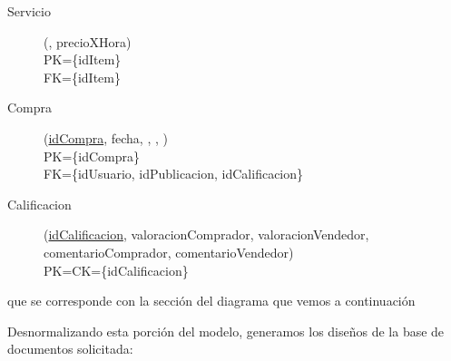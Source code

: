 \begin{description}
 \item[Servicio](\underline{}, precioXHora)\\
PK=\{idItem\}\\
FK=\{idItem\}

 \item[Compra](\underline{idCompra}, fecha, , , )\\
PK=\{idCompra\}\\
FK=\{idUsuario, idPublicacion, idCalificacion\}

 \item[Calificacion](\underline{idCalificacion}, valoracionComprador, valoracionVendedor, comentarioComprador, comentarioVendedor)\\
PK=CK=\{idCalificacion\}

\end{description}

que se corresponde con la secci\'on del diagrama que vemos a continuaci\'on

\begin{landscape}
    \begin{figure}[c]
    \end{figure}
\end{landscape}

Desnormalizando esta porci\'on del modelo, generamos los dise\~nos de la base de documentos solicitada:

